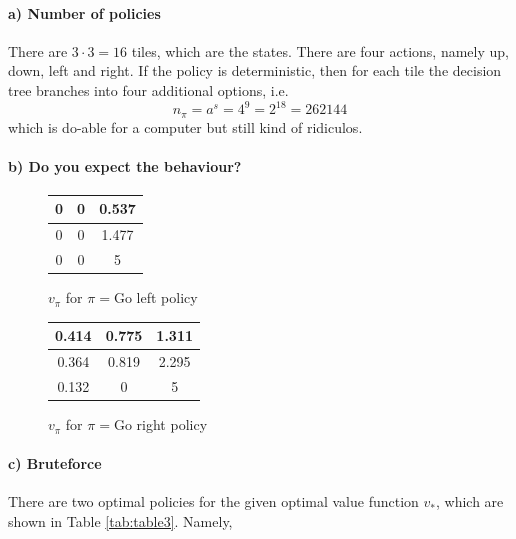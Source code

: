 \documentclass{article}
\begin{document}
\paragraph*{a) Number of policies}

There are $3\cdot 3 = 16$ tiles, which are the states. There are four actions, namely up, down, left and right. If the policy is deterministic, then for each tile the decision tree branches into four additional options, i.e.
\begin{equation}
    n_\pi = a^s = 4^{9} = 2^{18} = 262144
\end{equation}
which is do-able for a computer but still kind of ridiculos.

\paragraph*{b) Do you expect the behaviour?}

\begin{figure}[H]
    \begin{minipage}{0.45\textwidth}
    \centering
    \begin{tabular}{c|c|c}
    0 & 0 & 0.537 \\ \hline
    0 & 0 & 1.477 \\ \hline              
    0 & 0 & 5 \\
    \end{tabular}
    \caption{$v_\pi$ for $\pi =$Go left policy}
    \label{tab:table1}
    \end{minipage}
    \hfill
    \begin{minipage}{0.45\textwidth}
    \centering
    \begin{tabular}{c|c|c}
    0.414 & 0.775 & 1.311 \\ \hline
    0.364 & 0.819 & 2.295 \\ \hline                 
    0.132 & 0 & 5 \\
    \end{tabular}
    \caption{$v_\pi$ for $\pi =$Go right policy}
    \label{tab:table2}
    \end{minipage}
    \end{figure}


\paragraph*{c) Bruteforce}

There are two optimal policies for the given optimal value function $v_*$, which are shown in Table \ref{tab:table3}. Namely, 
\end{document}
